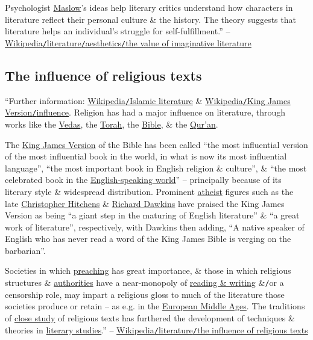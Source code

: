 \documentclass[oneside]{book}
\numberwithin{equation}{section}
\begin{document}
Psychologist \href{https://en.wikipedia.org/wiki/Abraham_Maslow}{Maslow}'s ideas help literary critics understand how characters in literature reflect their personal culture \& the history. The theory suggests that literature helps an individual's struggle for self-fulfillment.'' -- \href{https://en.wikipedia.org/wiki/Literature#The_value_of_imaginative_literature}{Wikipedia\texttt{/}literature\texttt{/}aesthetics\texttt{/}the value of imaginative literature}

\subsection{The influence of religious texts}
``Further information: \href{https://en.wikipedia.org/wiki/Islamic_literature}{Wikipedia\texttt{/}Islamic literature} \& \href{https://en.wikipedia.org/wiki/King_James_Version#Influence}{Wikipedia\texttt{/}King James Version\texttt{/}influence}. Religion has had a major influence on literature, through works like the \href{https://en.wikipedia.org/wiki/Vedas}{Vedas}, the \href{https://en.wikipedia.org/wiki/Torah}{Torah}, the \href{https://en.wikipedia.org/wiki/Bible}{Bible}, \& the \href{https://en.wikipedia.org/wiki/Qur%27an}{Qur'an}.

The \href{https://en.wikipedia.org/wiki/King_James_Version}{King James Version} of the Bible has been called ``the most influential version of the most influential book in the world, in what is now its most influential language'', ``the most important book in English religion \& culture'', \& ``the most celebrated book in the \href{https://en.wikipedia.org/wiki/English-speaking_world}{English-speaking world}'' -- principally because of its literary style \& widespread distribution. Prominent \href{https://en.wikipedia.org/wiki/Atheism}{atheist} figures such as the late \href{https://en.wikipedia.org/wiki/Christopher_Hitchens}{Christopher Hitchens} \& \href{https://en.wikipedia.org/wiki/Richard_Dawkins}{Richard Dawkins} have praised the King James Version as being ``a giant step in the maturing of English literature'' \& ``a great work of literature'', respectively, with Dawkins then adding, ``A native speaker of English who has never read a word of the King James Bible is verging on the barbarian''.

Societies in which \href{https://en.wikipedia.org/wiki/Preaching}{preaching} has great importance, \& those in which religious structures \& \href{https://en.wikipedia.org/wiki/Clergy}{authorities} have a near-monopoly of \href{https://en.wikipedia.org/wiki/Literacy}{reading \& writing} \&\texttt{/}or a censorship role, may impart a religious gloss to much of the literature those societies produce or retain -- as e.g. in the \href{https://en.wikipedia.org/wiki/European_Middle_Ages}{European Middle Ages}. The traditions of \href{https://en.wikipedia.org/wiki/Textual_criticism}{close study} of religious texts has furthered the development of techniques \& theories in \href{https://en.wikipedia.org/wiki/Literary_studies}{literary studies}.'' -- \href{https://en.wikipedia.org/wiki/Literature#The_influence_of_religious_texts}{Wikipedia\texttt{/}literature\texttt{/}the influence of religious texts}
\end{document}
